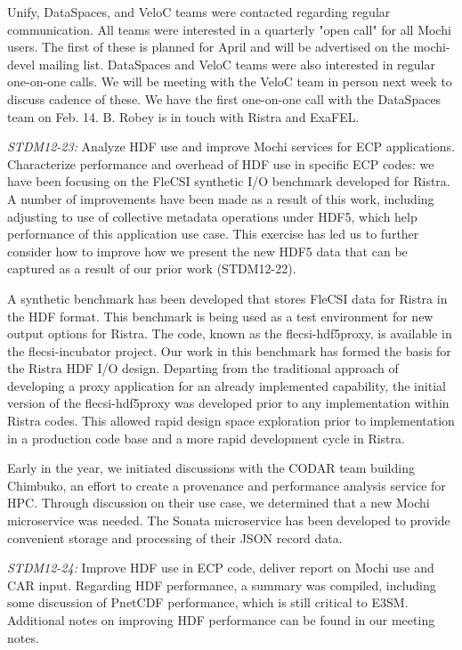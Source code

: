 Unify, DataSpaces, and VeloC teams were contacted regarding regular
communication. All teams were interested in a quarterly "open call" for all
Mochi users. The first of these is planned for April and will be advertised on
the mochi-devel mailing list. DataSpaces and VeloC teams were also interested
in regular one-on-one calls. We will be meeting with the VeloC team in person
next week to discuss cadence of these. We have the first one-on-one call with
the DataSpaces team on Feb. 14. B. Robey is in touch with Ristra and ExaFEL. 

\emph{STDM12-23:} Analyze HDF use and improve Mochi services for ECP
applications. Characterize performance and overhead of HDF use in specific ECP
codes: we have been focusing on the FleCSI synthetic I/O benchmark developed
for Ristra. A number of improvements have been made as a result of this work,
including adjusting to use of collective metadata operations under HDF5, which
help performance of this application use case. This exercise has led us to
further consider how to improve how we present the new HDF5 data that can be
captured as a result of our prior work (STDM12-22).

A synthetic benchmark has been developed that stores FleCSI data for Ristra in
the HDF format. This benchmark is being used as a test environment for new
output options for Ristra. The code, known as the flecsi-hdf5proxy, is
available in the flecsi-incubator project. Our work in this benchmark has
formed the basis for the Ristra HDF I/O design. Departing from the traditional
approach of developing a proxy application for an already implemented
capability, the initial version of the flecsi-hdf5proxy was developed prior to
any implementation within Ristra codes. This allowed rapid design space
exploration prior to implementation in a production code base and a more rapid
development cycle in Ristra.

Early in the year, we initiated discussions with the CODAR team building
Chimbuko, an effort to create a provenance and performance analysis service for
HPC. Through discussion on their use case, we determined that a new Mochi
microservice was needed. The Sonata microservice has been developed to provide
convenient storage and processing of their JSON record data.

\emph{STDM12-24:} Improve HDF use in ECP code, deliver report on Mochi use and
CAR input. Regarding HDF performance, a summary was compiled, including some
discussion of PnetCDF performance, which is still critical to E3SM. Additional
notes on improving HDF performance can be found in our meeting notes.

